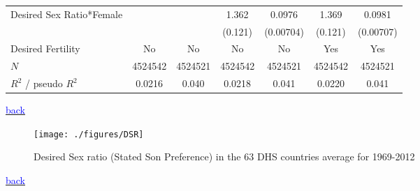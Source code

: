 \documentclass[10pt,letterpaper,subeqn]{beamer}
\begin{document}
\begin{frame}[label=DSRIMR]
\begin{table}[h!]
{\begin{tabular}{l*{6}{c}}
Desired Sex Ratio*Female&                     &                     &       1.362\sym{***}&      0.0976\sym{***}&       1.369\sym{***}&      0.0981\sym{***}\\
            &                     &                     &     (0.121)         &   (0.00704)         &     (0.121)         &   (0.00707)         \\


\hline
Desired Fertility&     No         &         No         &     No         &     No         &     Yes         &         Yes         \\
\hline
\(N\)       &     4524542         &     4524521         &     4524542         &     4524521         &     4524542         &     4524521         \\
$R^{2}$  / pseudo $R^{2}$& 0.0216  &       0.040         & 0.0218             &       0.041         &     0.0220          &       0.041         \\
\bottomrule
\end{tabular}}
\end{table}
{\footnotesize \hyperlink{DSR}{\textcolor{blue}{back}}}
\end{frame}


\begin{frame}[plain,label=DSRMap]
\begin{figure}[h!]
\centering
\texttt{[image: ./figures/DSR]}
\caption{Desired Sex ratio (Stated Son Preference) in the 63 DHS countries average for 1969-2012}
\end{figure}
{\footnotesize \hyperlink{DSR}{\textcolor{blue}{back}}}
\end{frame}
\end{document}

